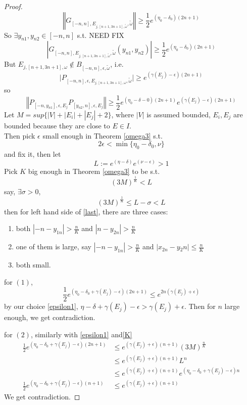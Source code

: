 \begin{proof}
\[
  \left\Vert G_{[-n,n],E_{j,[n+1,3n+1],\tilde{\omega}},\tilde{\omega}}\right\Vert\geq \frac{1}{2}e^{(\eta_0-\delta_0)(2n+1)}
\]
So $\exists y_{n1},y_{n2}\in [-n,n]$ s.t.
NEED FIX
\[
  \left\vert G_{[-n,n],E_{j,[n+1,3n+1],\tilde{\omega}},\tilde{\omega}}(y_{n1},y_{n2})\right\vert\geq \frac{1}{2}e^{(\eta_0-\delta_0)(2n+1)}
\]
But $E_{j,[n+1,3n+1],\omega}\notin B_{[-n,n],\epsilon,\tilde{\omega}}$, i.e.
\[
\vert P_{[-n,n],\epsilon,E_{j,[n+1,3n+1],\omega},\tilde{\omega}}\vert\geq e^{(\gamma(E_j)-\epsilon)(2n+1)}
\]
so
\begin{equation}\label{last}
  \left\Vert P_{[-n,y_{n1}],\epsilon,E_j}P_{[y_{n2},n],\epsilon,E_j}\right\Vert\geq\frac{1}{2}e^{(\eta_0-\delta-0)(2n+1)}e^{(\gamma(E_j)-\epsilon)(2n+1)}
\end{equation}
Let $M= sup\{|V|+|E_i|+|E_j|+2\}$, where $|V|$ is assumed bounded, $E_i,E_j$ are bounded because they are close to $E\in I$.\\
Then pick $\epsilon$ small enough in Theorem \ref{omega3} s.t.
  \begin{equation}\label{epsilon1}
    2\epsilon<\min\{\eta_0-\delta_0,\nu\}
  \end{equation}
and fix it, then let
  \[L:=e^{(\eta-\delta)}e^{(\nu-\epsilon)}>1\]
Pick $K$ big enough in Theorem \ref{omega3} to be s.t.
  \[(3M)^{\frac{1}{K}}<L\]
say, $\exists \sigma>0$,
\begin{equation}\label{K}
(3M)^{\frac{1}{K}}\leq L-\sigma<L
\end{equation}
then for left hand side of \eqref{last}, there are three cases:
\begin{enumerate}
  \item both $|-n-y_{1n}|>\frac{n}{K}$ and $|n-y_{2n}|>\frac{n}{K}$
  \item one of them is large, say $|-n-y_{1n}|>\frac{n}{K}$ and $|x_{2n}-y{_2n}|\leq\frac{n}{K}$
  \item both small.
\end{enumerate}

for $(1)$,
\[
\frac{1}{2}e^{(\eta_0-\delta_0+\gamma(E_j)-\epsilon)(2n+1)}\leq e^{2n(\gamma(E_j)+\epsilon)}
\]
by our choice \eqref{epsilon1},
 $\eta-\delta+\gamma(E_j)-\epsilon>\gamma(E_j)+\epsilon$. Then for $n$ large enough, we get contradiction.

for $(2)$, similarly with \eqref{epsilon1} and\eqref{K}
\[
  \begin{aligned}
    \frac{1}{2}e^{(\eta_0-\delta_0+\gamma(E_j)-\epsilon)(2n+1)}
    &\leq e^{(\gamma(E_j)+\epsilon)(n+1)}(3M)^{\frac{n}{K}}\\
    &\leq e^{(\gamma(E_j)+\epsilon)(n+1)} L^n\\
    &\leq e^{(\gamma(E_j)+\epsilon)(n+1)} e^{(\eta_0-\delta_0+\gamma(E_j)-\epsilon)n}\\
    \frac{1}{2}e^{(\eta_0-\delta_0+\gamma(E_j)-\epsilon)(n+1)}
    &\leq e^{(\gamma(E_j)+\epsilon)(n+1)}
  \end{aligned}
\]
We get contradiction.


\end{proof}

